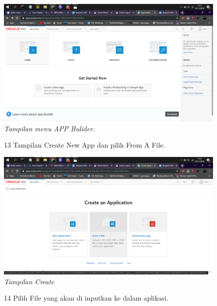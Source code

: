 \begin{enumerate}
\begin{figure}
    \begin{center}
\includegraphics[scale=0.2]{figures/11.png}
    \caption{\textit{Tampilan menu APP Bulider.}}
        \end{center}
\label{gambar}
\end{figure}

\begin{figure}
\item[13] Tampilan Create New App dan pilih From A File.

    \begin{center}
\includegraphics[scale=0.2]{figures/12.png}
    \caption{\textit{Tampilan Create}}
        \end{center}
\label{gambar}
\end{figure}

\begin{figure}
\item[14] Pilih File yang akan di inputkan ke dalam aplikasi.


\end{figure}
\end{enumerate}
